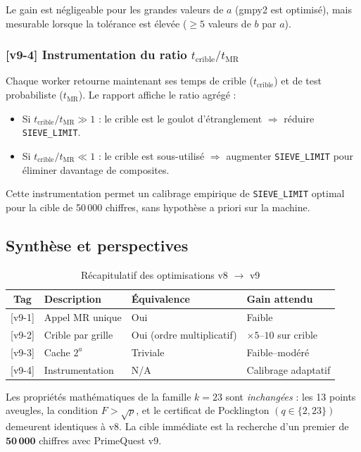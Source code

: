 Le gain est négligeable pour les grandes valeurs de $a$ (gmpy2 est optimisé),
mais mesurable lorsque la tolérance est élevée ($\geq 5$ valeurs de $b$ par $a$).

\subsubsection{[v9-4] Instrumentation du ratio $t_{\text{crible}}/t_{\text{MR}}$}
\label{subsubsec:instrumentation}

Chaque worker retourne maintenant ses temps de crible ($t_{\text{crible}}$) et de
test probabiliste ($t_{\text{MR}}$). Le rapport affiche le ratio agrégé :

\begin{itemize}
  \item Si $t_{\text{crible}}/t_{\text{MR}} \gg 1$ : le crible est le goulot d'étranglement
  $\Rightarrow$ réduire \texttt{SIEVE\_LIMIT}.
  \item Si $t_{\text{crible}}/t_{\text{MR}} \ll 1$ : le crible est sous-utilisé
  $\Rightarrow$ augmenter \texttt{SIEVE\_LIMIT} pour éliminer davantage de composites.
\end{itemize}

Cette instrumentation permet un calibrage empirique de \texttt{SIEVE\_LIMIT}
optimal pour la cible de 50\,000 chiffres, sans hypothèse a priori sur la machine.

\subsection{Synthèse et perspectives}
\label{subsec:synthese}

\begin{table}[h]
\centering
\caption{Récapitulatif des optimisations v8 $\to$ v9}
\label{tab:recap_v8_v9}
\begin{tabular}{clll}
\hline
Tag & Description & Équivalence & Gain attendu \\
\hline
{[v9-1]} & Appel MR unique & Oui & Faible \\
{[v9-2]} & Crible par grille & Oui (ordre multiplicatif) & $\times 5$--$10$ sur crible \\
{[v9-3]} & Cache $2^a$ & Triviale & Faible--modéré \\
{[v9-4]} & Instrumentation & N/A & Calibrage adaptatif \\
\hline
\end{tabular}
\end{table}

Les propriétés mathématiques de la famille $k=23$ sont \emph{inchangées} :
les 13 points aveugles, la condition $F > \sqrt{p}$, et le certificat de Pocklington
$(q \in \{2, 23\})$ demeurent identiques à v8. La cible immédiate est la recherche
d'un premier de $\mathbf{50\,000}$ chiffres avec PrimeQuest v9.
